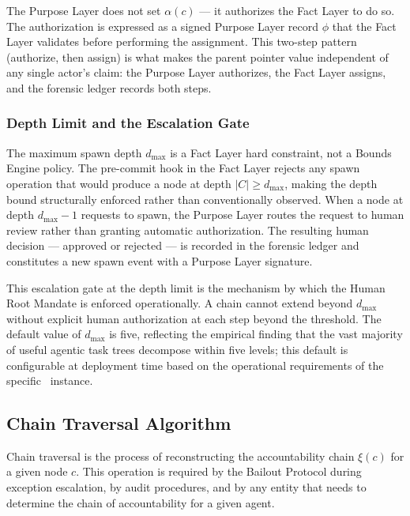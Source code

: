 The Purpose Layer does not set $\alpha(c)$ — it authorizes the Fact Layer to do so. The authorization is expressed as a signed Purpose Layer record $\phi$ that the Fact Layer validates before performing the assignment. This two-step pattern (authorize, then assign) is what makes the parent pointer value independent of any single actor's claim: the Purpose Layer authorizes, the Fact Layer assigns, and the forensic ledger records both steps.

\subsubsection{Depth Limit and the Escalation Gate}
\label{sec:depth-limit-escalation}

The maximum spawn depth $d_{\max}$ is a Fact Layer hard constraint, not a Bounds Engine policy. The pre-commit hook in the Fact Layer rejects any spawn operation that would produce a node at depth $|C| \geq d_{\max}$, making the depth bound structurally enforced rather than conventionally observed. When a node at depth $d_{\max} - 1$ requests to spawn, the Purpose Layer routes the request to human review rather than granting automatic authorization. The resulting human decision — approved or rejected — is recorded in the forensic ledger and constitutes a new spawn event with a Purpose Layer signature.

This escalation gate at the depth limit is the mechanism by which the Human Root Mandate is enforced operationally. A chain cannot extend beyond $d_{\max}$ without explicit human authorization at each step beyond the threshold. The default value of $d_{\max}$ is five, reflecting the empirical finding that the vast majority of useful agentic task trees decompose within five levels; this default is configurable at deployment time based on the operational requirements of the specific \bxthree\ instance.

\subsection{Chain Traversal Algorithm}
\label{sec:chain-traversal-algorithm}

Chain traversal is the process of reconstructing the accountability chain $\xi(c)$ for a given node $c$. This operation is required by the Bailout Protocol during exception escalation, by audit procedures, and by any entity that needs to determine the chain of accountability for a given agent.

